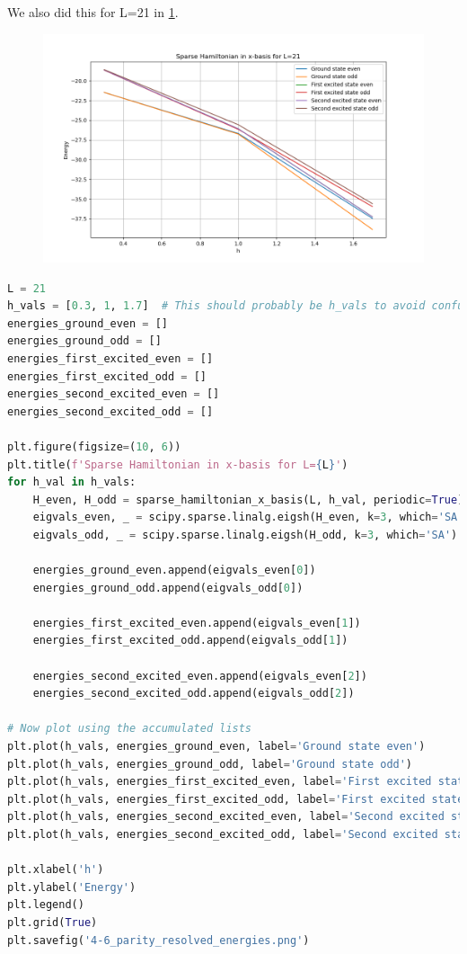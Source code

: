\documentclass[12pt]{article}
\begin{document}
We also did this for L=21 in \ref{4-6_parity_resolved_energies.png}.
\begin{figure}[h]
\centering
\includegraphics[width=\textwidth]{4-6_parity_resolved_energies.png}
\label{4-6_parity_resolved_energies.png}
\end{figure}
\begin{lstlisting}[language=Python]
L = 21
h_vals = [0.3, 1, 1.7]  # This should probably be h_vals to avoid confusion with h in plt.plot
energies_ground_even = []
energies_ground_odd = []
energies_first_excited_even = []
energies_first_excited_odd = []
energies_second_excited_even = []
energies_second_excited_odd = []

plt.figure(figsize=(10, 6))
plt.title(f'Sparse Hamiltonian in x-basis for L={L}')
for h_val in h_vals:
    H_even, H_odd = sparse_hamiltonian_x_basis(L, h_val, periodic=True)
    eigvals_even, _ = scipy.sparse.linalg.eigsh(H_even, k=3, which='SA')
    eigvals_odd, _ = scipy.sparse.linalg.eigsh(H_odd, k=3, which='SA')
    
    energies_ground_even.append(eigvals_even[0])
    energies_ground_odd.append(eigvals_odd[0])

    energies_first_excited_even.append(eigvals_even[1])
    energies_first_excited_odd.append(eigvals_odd[1])

    energies_second_excited_even.append(eigvals_even[2])
    energies_second_excited_odd.append(eigvals_odd[2])

# Now plot using the accumulated lists
plt.plot(h_vals, energies_ground_even, label='Ground state even')
plt.plot(h_vals, energies_ground_odd, label='Ground state odd')
plt.plot(h_vals, energies_first_excited_even, label='First excited state even')
plt.plot(h_vals, energies_first_excited_odd, label='First excited state odd')
plt.plot(h_vals, energies_second_excited_even, label='Second excited state even')
plt.plot(h_vals, energies_second_excited_odd, label='Second excited state odd')

plt.xlabel('h')
plt.ylabel('Energy')
plt.legend()
plt.grid(True)
plt.savefig('4-6_parity_resolved_energies.png')

\end{lstlisting}
\end{document}
